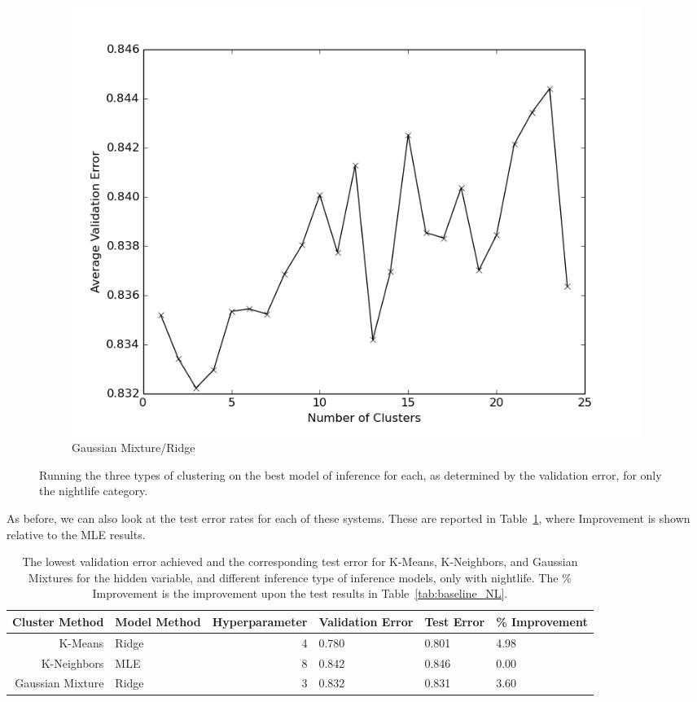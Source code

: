 \documentclass[11pt]{article}
\begin{document}
\begin{figure}[h!]
\begin{subfigure}[h!]{0.33\textwidth}
        \includegraphics[width=\textwidth]{NL_GM_ridge.png}
        \caption{Gaussian Mixture/Ridge}
        \label{fig:gmBEST}
    \end{subfigure}
    \caption{Running the three types of clustering on the best model of inference for each, as determined by the validation error, for only the nightlife category.}
    \label{fig:BEST_NL}
\end{figure}

As before, we can also look at the test error rates for each of these systems. These are reported in Table~\ref{tab:improvement_NL}, where Improvement is shown relative to the MLE results.

\begin{table}[h!]
    \begin{tabularx}{1.0\textwidth}{| r | X | r | X | X | X |}
        \hline
        Cluster Method & Model Method & Hyperparameter & Validation Error & Test Error & \% \mbox{Improvement}\\
        \hline
        K-Means & Ridge & 4 & 0.780 & 0.801 & 4.98 \\
        K-Neighbors & MLE & 8 & 0.842 & 0.846 & 0.00 \\
        Gaussian Mixture & Ridge & 3 & 0.832 & 0.831 & 3.60 \\
        \hline
    \end{tabularx}
    \caption{The lowest validation error achieved and the corresponding test error for K-Means, K-Neighbors, and Gaussian Mixtures for the hidden variable, and different inference type of inference models, only with nightlife. The \% Improvement is the improvement upon the test results in Table~\ref{tab:baseline_NL}.}
    \label{tab:improvement_NL}
\end{table}
\end{document}
